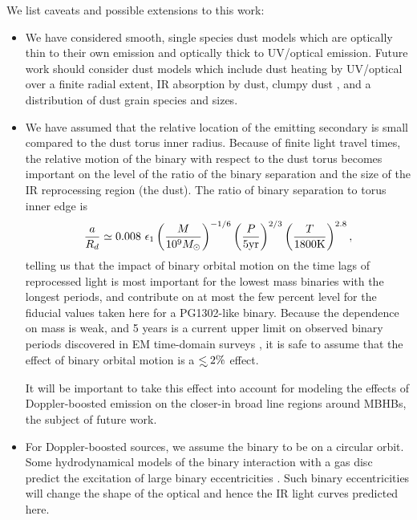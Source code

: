 We list caveats and possible extensions to this work: 
\begin{itemize}

\item{ 

We have considered smooth, single species dust models which are optically thin
to their own emission and optically thick to UV/optical emission. Future work
should consider dust models which include dust heating by UV/optical over a
finite radial extent, IR absorption by dust, clumpy dust
\citep[\textit{e.g}][and references therein]{Netzer:2015:rev}, and a
distribution of dust grain species and sizes. 

}



\item 
We have assumed that the relative location of the emitting secondary is small
compared to the dust torus inner radius. Because of finite light travel times,
the relative motion of the binary with respect to the dust torus becomes
important on the level of the ratio of the binary separation and the size of
the IR reprocessing region (the dust). The ratio of binary separation to
torus inner edge is
\begin{equation}
\frac{a}{R_d} \simeq 0.008\ \epsilon_{1} \left(\frac{M}{10^9 {M_{\odot}}}\right)^{-1/6}  \left(\frac{P}{5 \rm{yr}}\right)^{2/3}  \left(\frac{T}{1800 \rm{K}}\right)^{2.8},
\label{Eq:aORd}
\end{equation}
telling us that the impact of binary orbital motion on the time lags of
reprocessed light is most important for the lowest mass binaries with the
longest periods, and contribute on at most the few percent level for the
fiducial values taken here for a PG1302-like binary. Because the dependence on
mass is weak, and 5 years is a current upper limit on observed binary periods
discovered in EM time-domain surveys \citep[\textit{e.g.}][]{Graham+2015b}, it
is safe to assume that the effect of binary orbital motion is a $\lsim 2\%$
effect.

It will be important to take this effect into account for modeling the effects
of Doppler-boosted emission on the closer-in broad line regions around MBHBs,
the subject of future work.


\item For Doppler-boosted sources, we assume the binary to be on a circular
orbit. Some hydrodynamical models of the binary interaction with a gas disc
predict the excitation of large binary eccentricities
\citep{Roedig:2011:eccevo}. Such binary eccentricities will change the shape
of the optical and hence the IR light curves predicted here.






\end{itemize}
